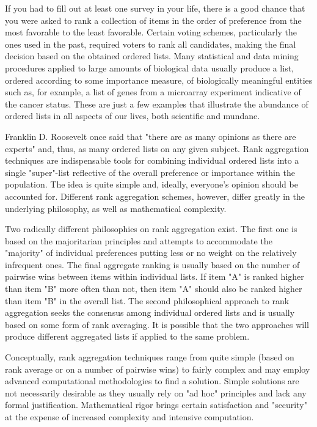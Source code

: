 \documentclass[11pt]{article}
\begin{document}
If you had to fill out at least one survey in your life, there is a 
good chance that you were asked to rank a collection of items in the 
order of preference from the most favorable to the least favorable. 
Certain voting schemes, particularly the ones used in the past, required 
voters to rank all candidates, making the final decision based on the 
obtained ordered lists. Many statistical and data mining procedures 
applied to large amounts of biological data usually produce a list, 
ordered according to some importance measure, of biologically 
meaningful entities such as, for example, a list of genes from a 
microarray experiment indicative of the cancer status. These are 
just a few examples that illustrate the abundance of ordered lists 
in all aspects of our lives, both scientific and mundane.

Franklin D. Roosevelt once said that "there are as many opinions as 
there are experts" and, thus, as many ordered lists on any given 
subject. Rank aggregation techniques are indispensable tools for 
combining individual ordered lists into a single "super"-list 
reflective of the overall preference or importance within the 
population. The idea is quite simple and, ideally, everyone's 
opinion should be accounted for. Different rank aggregation schemes, 
however, differ greatly in the underlying philosophy, as well as 
mathematical complexity.

Two radically different philosophies on rank aggregation exist. The 
first one is based on the majoritarian principles and attempts to accommodate the "majority" 
of individual preferences putting less or no weight on the relatively infrequent ones. The final 
aggregate ranking is usually based on the number of pairwise wins between 
items within individual lists. If item "A" is ranked higher than 
item "B" more often than not, then item "A" should also be ranked 
higher than item "B" in the overall list. The second philosophical 
approach to rank aggregation seeks the consensus among 
individual ordered lists and is usually based on some form of rank 
averaging. It is possible that the two approaches will produce 
different aggregated lists if applied to the same problem.

Conceptually, rank aggregation techniques range from quite simple 
(based on rank average or on a number of pairwise wins) to fairly 
complex and may employ advanced computational methodologies to find 
a solution. Simple solutions are not necessarily desirable as they 
usually rely on "ad hoc" principles and lack any formal 
justification. Mathematical rigor brings certain satisfaction and 
"security" at the expense of increased complexity and intensive 
computation.
\end{document}
